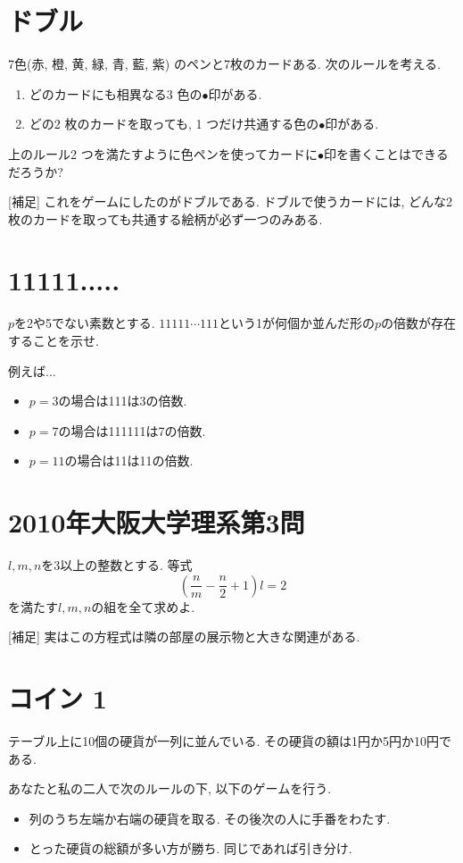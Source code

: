 \documentclass[dvipdfmx,a4paper,12pt]{article} %
\theoremstyle{definition}
\theoremstyle{remark}
\numberwithin{equation}{section}
\begin{document}
\section{ドブル}
7色(赤, 橙, 黄, 緑, 青, 藍, 紫) のペンと7枚のカードある. 次のルールを考える.
\begin{enumerate}
    \setlength{\parskip}{0cm} 
  \setlength{\itemsep}{0cm} 
\item どのカードにも相異なる3 色の$\bullet$印がある.
\item どの2 枚のカードを取っても, 1 つだけ共通する色の$\bullet$印がある.
\end{enumerate}
上のルール2 つを満たすように色ペンを使ってカードに$\bullet$印を書くことはできるだろうか?

[補足] これをゲームにしたのがドブルである. ドブルで使うカードには, どんな2枚のカードを取っても共通する絵柄が必ず一つのみある. 

\section{11111.....}
$p$を2や5でない素数とする. 
$11111\cdots 111$という1が何個か並んだ形の$p$の倍数が存在することを示せ.

\vspace{10pt}
例えば...
\begin{itemize}
    \setlength{\parskip}{0cm} 
  \setlength{\itemsep}{0cm} 
  \item $p=3$の場合は111は3の倍数.
  \item $p=7$の場合は111111は7の倍数.
  \item $p=11$の場合は11は11の倍数.
  \end{itemize}
  
\section{2010年大阪大学理系第3問}
$l,m,n$を3以上の整数とする. 等式
$$
\left( \frac{n}{m} - \frac{n}{2} + 1 \right)l = 2
$$
を満たす$l,m,n$の組を全て求めよ. 

[補足] 実はこの方程式は隣の部屋の展示物と大きな関連がある. 



\section{コイン 1}
テーブル上に10個の硬貨が一列に並んでいる. 
その硬貨の額は1円か5円か10円である. 

あなたと私の二人で次のルールの下, 以下のゲームを行う.
\begin{itemize}
\item 列のうち左端か右端の硬貨を取る. その後次の人に手番をわたす.
\item とった硬貨の総額が多い方が勝ち. 同じであれば引き分け. 
\end{itemize}
\end{document}
